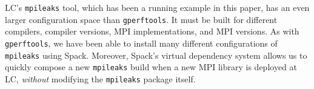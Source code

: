 LC's {\tt mpileaks} tool, which has been a running example in this paper,
has an even larger configuration space than {\tt gperftools}.  It must be built
for different compilers, compiler versions, MPI implementations, and MPI
versions. As with {\tt gperftools}, we have been able to install many different
configurations of {\tt mpileaks} using Spack.  Moreover, Spack's virtual dependency 
system allows us to quickly compose a new {\tt mpileaks} build when a new MPI library is 
deployed at LC, {\it without} modifying the {\tt mpileaks} package itself.
